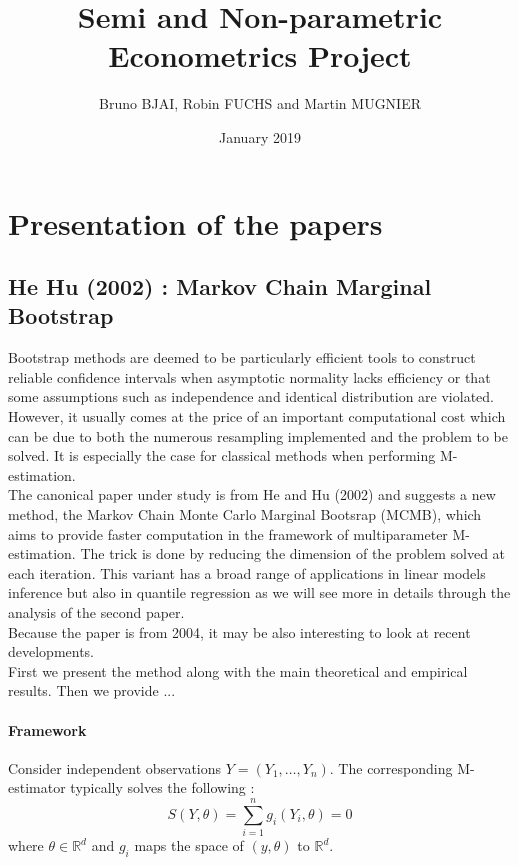 \documentclass[11pt]{article}
\title{Semi and Non-parametric Econometrics Project}
\author{Bruno BJAI, Robin FUCHS and Martin MUGNIER}
\date{January 2019}
\begin{document}
\maketitle



\section{Presentation of the papers}

\subsection{He Hu (2002) : Markov Chain Marginal Bootstrap}

Bootstrap methods are deemed to be particularly efficient tools to construct reliable confidence intervals when asymptotic normality lacks efficiency or that some assumptions such as independence and identical distribution are violated. However, it usually comes at the price of an important computational cost which can be due to both the numerous resampling implemented and the problem to be solved. It is especially the case for classical methods when performing M-estimation.  \\

The canonical paper under study is from He and Hu (2002) and suggests a new method, the Markov Chain Monte Carlo Marginal Bootsrap (MCMB), which aims to provide faster computation in the framework of multiparameter M-estimation. The trick is done by reducing the dimension of the problem solved at each iteration. This variant has a broad range of applications in linear models inference but also in quantile regression as we will see more in details through the analysis of the second paper. \\

Because the paper is from 2004, it may be also interesting to look at recent developments. \\

First we present the method along with the main theoretical and empirical results. Then we provide ...


\paragraph{Framework}
Consider independent observations $Y = (Y_1, \dots, Y_n)$. The corresponding M-estimator typically solves the following : 
\begin{equation}
\label{eqpb}
S(Y, \theta) = \sum_{i=1}^n g_i(Y_i,\theta) = 0
\end{equation}
where $\theta \in \mathbb{R}^d$ and $g_i$ maps the space of $(y,\theta)$ to $\mathbb{R}^d$. \\
\end{document}

